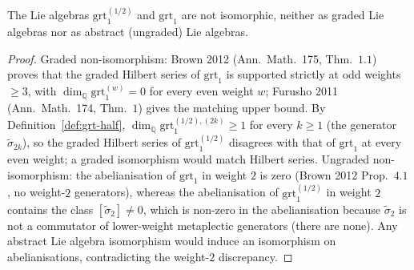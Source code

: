 \begin{proposition}[Non-isomorphism \texorpdfstring{$\mathrm{grt}_1^{(1/2)}\not\cong\mathrm{grt}_1$}{grt-1-(1/2)not =grt-1}]
\label{prop:grt-half-not-grt}
The Lie algebras $\mathrm{grt}_1^{(1/2)}$ and $\mathrm{grt}_1$ are not isomorphic,
neither as graded Lie algebras nor as abstract (ungraded) Lie algebras.
\end{proposition}

\begin{proof}
Graded non-isomorphism: Brown 2012 (Ann.\ Math.\ 175, Thm.~$1.1$) proves that
the graded Hilbert series of $\mathrm{grt}_1$ is supported strictly at odd
weights $\geq 3$, with $\dim_{\mathbb{Q}}\mathrm{grt}_1^{(w)}=0$ for every even
weight $w$; Furusho 2011 (Ann.\ Math.\ 174, Thm.~$1$) gives the matching upper
bound. By Definition~\ref{def:grt-half},
$\dim_{\mathbb{Q}}\mathrm{grt}_1^{(1/2),(2k)} \geq 1$ for every $k\geq 1$
(the generator $\widetilde\sigma_{2k}$), so the graded Hilbert series of
$\mathrm{grt}_1^{(1/2)}$ disagrees with that of $\mathrm{grt}_1$ at every even
weight; a graded isomorphism would match Hilbert series. Ungraded
non-isomorphism: the abelianisation of $\mathrm{grt}_1$ in weight $2$ is zero
(Brown 2012 Prop.~$4.1$, no weight-$2$ generators), whereas the abelianisation
of $\mathrm{grt}_1^{(1/2)}$ in weight $2$ contains the class
$[\widetilde\sigma_2]\neq 0$, which is non-zero in the abelianisation because
$\widetilde\sigma_2$ is not a commutator of lower-weight metaplectic generators
(there are none). Any abstract Lie algebra isomorphism would induce an
isomorphism on abelianisations, contradicting the weight-$2$ discrepancy.
\end{proof}


